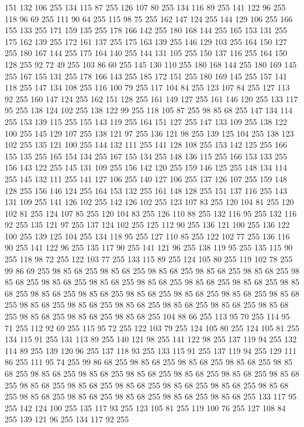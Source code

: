 151 132 106 255 134 115 87 255 126 107 80 255 134 116 89 255 141 122 96 255 118 96 69 255 111 90 64 255 115 98 75 255 162 147 124 255 144 129 106 255 166 155 133 255 171 159 135 255 178 166 142 255 180 168 144 255 165 153 131 255 175 162 139 255 172 161 137 255 175 163 139 255 146 129 103 255 164 150 127 255 180 167 144 255 175 164 140 255 144 131 105 255 150 137 116 255 164 150 128 255 92 72 49 255 103 86 60 255 145 130 110 255 180 168 144 255 180 169 145 255 167 155 131 255 178 166 143 255 185 172 151 255 180 169 145 255 157 141 118 255 147 134 108 255 116 100 79 255 117 104 84 255 123 107 84 255 127 113 92 255 160 147 124 255 162 151 128 255 161 149 127 255 161 146 120 255 133 117 95 255 138 124 102 255 138 122 99 255 118 105 87 255 98 85 68 255 147 134 114 255 153 139 115 255 155 143 119 255 164 151 127 255 147 133 109 255 138 122 100 255 145 129 107 255 138 121 97 255 136 121 98 255 139 125 104 255 138 123 102 255 135 121 100 255 144 132 111 255 141 128 108 255 153 142 125 255
166 155 135 255 165 154 134 255 167 155 134 255 148 136 115 255 166 153 133 255 156 143 122 255 145 131 109 255 156 142 120 255 159 146 125 255 148 134 114 255 145 132 111 255 141 127 106 255 140 127 106 255 137 126 107 255 159 148 128 255 156 146 124 255 164 153 132 255 161 148 128 255 151 137 116 255 143 131 109 255 141 126 102 255 142 126 102 255 123 107 83 255 120 104 81 255 120 102 81 255 124 107 85 255 120 104 83 255 126 110 88 255 132 116 95 255 132 116 92 255 135 121 97 255 137 124 102 255 125 112 90 255 136 121 100 255 136 122 100 255 139 125 104 255 134 118 95 255 127 110 85 255 122 102 77 255 136 116 90 255 141 122 96 255 135 117 90 255 141 121 96 255 138 119 95 255 135 115 90 255 118 98 72 255 122 103 77 255 133 115 89 255 124 105 80 255 119 102 78 255 99 86 69 255 98 85 68 255 98 85 68 255 98 85 68 255 98 85 68 255 98 85 68 255 98 85 68 255 98 85 68 255 98 85 68 255 98 85 68 255 98 85 68 255 98 85 68 255 98 85 68 255 98 85 68 255
98 85 68 255 98 85 68 255 98 85 68 255 98 85 68 255 98 85 68 255 98 85 68 255 98 85 68 255 98 85 68 255 98 85 68 255 98 85 68 255 98 85 68 255 98 85 68 255 98 85 68 255 98 85 68 255 104 88 66 255 113 95 70 255 114 95 71 255 112 92 69 255 115 95 72 255 122 103 79 255 124 105 80 255 124 105 81 255 134 115 91 255 131 113 89 255 140 121 98 255 141 122 98 255 137 119 94 255 132 114 89 255 139 120 96 255 137 118 93 255 133 115 91 255 137 119 94 255 129 111 86 255 111 95 74 255 99 86 68 255 98 85 68 255 98 85 68 255 98 85 68 255 98 85 68 255 98 85 68 255 98 85 68 255 98 85 68 255 98 85 68 255 98 85 68 255 98 85 68 255 98 85 68 255 98 85 68 255 98 85 68 255 98 85 68 255 98 85 68 255 98 85 68 255 98 85 68 255 98 85 68 255 98 85 68 255 98 85 68 255 98 85 68 255 133 117 95 255 142 124 100 255 135 117 93 255 123 105 81 255 119 100 76 255 127 108 84 255 139 121 96 255 134 117 92 255

